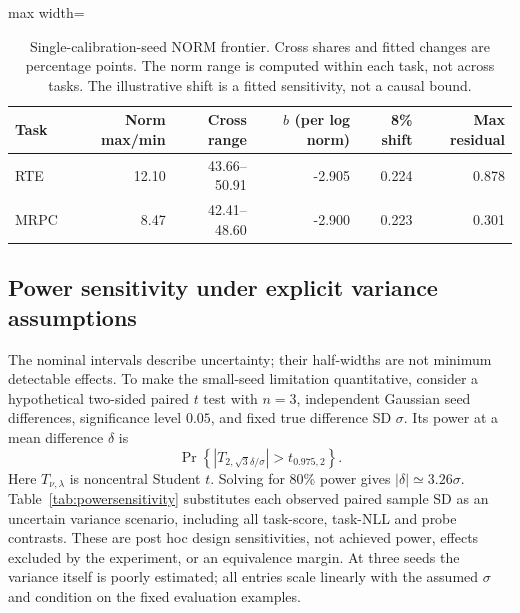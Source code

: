 \documentclass{article}
\begin{document}
\begin{table}[t]
\centering
\caption{Single-calibration-seed NORM frontier. Cross shares and fitted changes are percentage points. The norm range is computed within each task, not across tasks. The illustrative shift is a fitted sensitivity, not a causal bound.}
\label{tab:frontiersensitivity}
\begin{adjustbox}{max width=\linewidth}
\begin{tabular}{lrrrrr}
\toprule
Task & Norm max/min & Cross range & $b$ (per log norm) & 8\% shift & Max residual\\
\midrule
RTE & 12.10 & 43.66--50.91 & -2.905 & 0.224 & 0.878 \\
MRPC & 8.47 & 42.41--48.60 & -2.900 & 0.223 & 0.301 \\
\bottomrule
\end{tabular}
\end{adjustbox}
\end{table}

\subsection{Power sensitivity under explicit variance assumptions}
\label{app:powersensitivity}
The nominal intervals describe uncertainty; their half-widths are not minimum detectable effects. To make the small-seed limitation quantitative, consider a hypothetical two-sided paired $t$ test with $n=3$, independent Gaussian seed differences, significance level $0.05$, and fixed true difference SD $\sigma$. Its power at a mean difference $\delta$ is
\begin{equation}
\Pr\!\left\{|T_{2,\sqrt3\delta/\sigma}|>t_{0.975,2}\right\}.
\end{equation}
Here $T_{\nu,\lambda}$ is noncentral Student $t$. Solving for 80\% power gives $|\delta|\simeq3.26\sigma$. Table~\ref{tab:powersensitivity} substitutes each observed paired sample SD as an uncertain variance scenario, including all task-score, task-NLL and probe contrasts. These are post hoc design sensitivities, not achieved power, effects excluded by the experiment, or an equivalence margin. At three seeds the variance itself is poorly estimated; all entries scale linearly with the assumed $\sigma$ and condition on the fixed evaluation examples.
\end{document}
